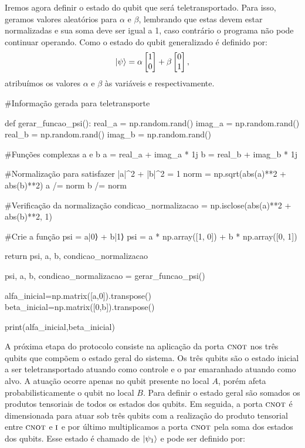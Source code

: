 Iremos agora definir o estado do qubit que será teletransportado. Para isso, geramos valores aleatórios para \(\alpha\) e \(\beta\), lembrando que estas devem estar normalizadas e sua soma deve ser igual a 1, caso contrário o programa não pode continuar operando. Como o estado do qubit generalizado é definido por:
\[ \ket{\psi} =
  \alpha \begin{bmatrix} 1 \\ 0 \end{bmatrix} +
  \beta \begin{bmatrix} 0 \\ 1 \end{bmatrix},
\]
atribuímos os valores \(\alpha\) e \(\beta\) às variáveis  e  respectivamente.
\begin{pycode}
    #Informação gerada para teletransporte

def gerar_funcao_psi():
    real_a = np.random.rand()  
    imag_a = np.random.rand()  
    real_b = np.random.rand()  
    imag_b = np.random.rand()  
    
    #Funções complexas a e b
    a = real_a + imag_a * 1j
    b = real_b + imag_b * 1j
    
    #Normalização para satisfazer |a|^2 + |b|^2 = 1
    norm = np.sqrt(abs(a)**2 + abs(b)**2)
    a /= norm
    b /= norm
    
    #Verificação da normalização
    condicao_normalizacao = np.isclose(abs(a)**2 + abs(b)**2, 1)
    
    #Crie a função psi = a|0⟩ + b|1⟩
    psi = a * np.array([1, 0]) + b * np.array([0, 1])
    
    return psi, a, b, condicao_normalizacao

psi, a, b, condicao_normalizacao = gerar_funcao_psi()

alfa_inicial=np.matrix([a,0]).transpose()
beta_inicial=np.matrix([0,b]).transpose()

print(alfa_inicial,beta_inicial)
\end{pycode}
A próxima etapa do protocolo consiste na aplicação da porta \(\operatorname{\textsc{cnot}}\) nos três qubits que compõem o estado geral do sistema. Os três qubits são o estado inicial a ser teletransportado atuando como controle e o par emaranhado atuando como alvo. A atuação ocorre apenas no qubit presente no local \(A\), porém afeta probabilisticamente o qubit no local \(B\). Para definir o estado geral são somados os produtos tensoriais de todos os estados dos qubits. Em seguida, a porta \(\operatorname{\textsc{cnot}}\) é dimensionada para atuar sob três qubits com a realização do produto tensorial entre \(\operatorname{\textsc{cnot}}\) e \(\operatorname{\textsc{i}}\) e por último multiplicamos a porta \(\operatorname{\textsc{cnot}}\) pela soma dos estados dos qubits. Esse estado é chamado de \(\ket{\psi_1}\) e pode ser definido por:
